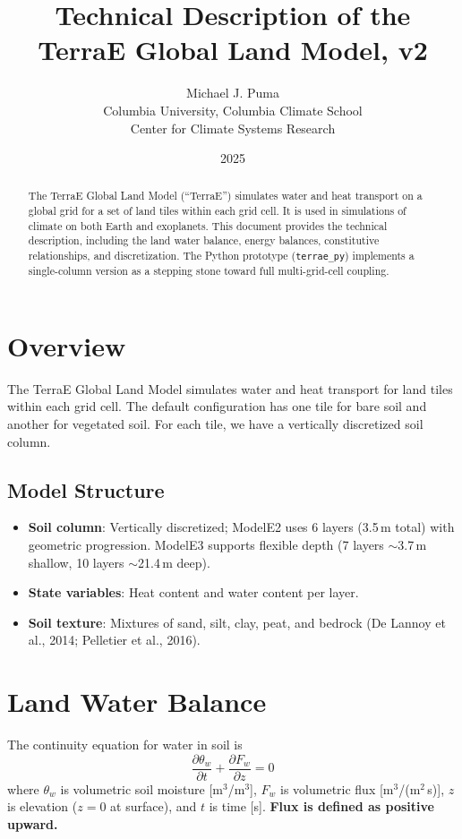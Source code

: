 \documentclass[11pt,a4paper]{article}
\title{Technical Description of the TerraE Global Land Model, v2}
\author{Michael J. Puma\\Columbia University, Columbia Climate School\\Center for Climate Systems Research}
\date{2025}
\begin{document}
\maketitle

\begin{abstract}
The TerraE Global Land Model (``TerraE'') simulates water and heat transport on a global grid for a set of land tiles within each grid cell. It is used in simulations of climate on both Earth and exoplanets. This document provides the technical description, including the land water balance, energy balances, constitutive relationships, and discretization. The Python prototype (\texttt{terrae\_py}) implements a single-column version as a stepping stone toward full multi-grid-cell coupling.
\end{abstract}

\section{Overview}

The TerraE Global Land Model simulates water and heat transport for land tiles within each grid cell. The default configuration has one tile for bare soil and another for vegetated soil. For each tile, we have a vertically discretized soil column.

\subsection{Model Structure}

\begin{itemize}
\item \textbf{Soil column}: Vertically discretized; ModelE2 uses 6 layers (3.5\,m total) with geometric progression. ModelE3 supports flexible depth (7 layers $\sim$3.7\,m shallow, 10 layers $\sim$21.4\,m deep).
\item \textbf{State variables}: Heat content and water content per layer.
\item \textbf{Soil texture}: Mixtures of sand, silt, clay, peat, and bedrock (De Lannoy et al., 2014; Pelletier et al., 2016).
\end{itemize}

\section{Land Water Balance}

The continuity equation for water in soil is
\begin{equation}
\frac{\partial \theta_w}{\partial t} + \frac{\partial F_w}{\partial z} = 0
\end{equation}
where $\theta_w$ is volumetric soil moisture [m$^3$/m$^3$], $F_w$ is volumetric flux [m$^3$/(m$^2$\,s)], $z$ is elevation ($z=0$ at surface), and $t$ is time [s]. \textbf{Flux is defined as positive upward.}
\end{document}
